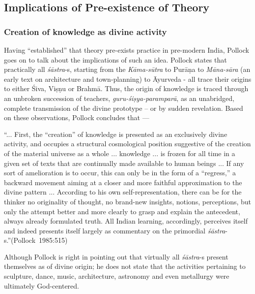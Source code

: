 \subsection{Implications of Pre-existence of Theory}\label{art12-sec3.8}

\subsubsection{Creation of knowledge as divine activity}\label{art12-sec3.8.1}

Having ``established'' that theory pre-exists practice in pre-modern India, Pollock goes on to talk about the implications of such an idea. Pollock states that practically all {\sl śāstra}-s, starting from the {\sl Kāma-sūtra} to Purāṇa to {\sl Māna-sāra} (an early text on architecture and town-planning) to Āyurveda - all trace their origins  to either Śiva, Viṣṇu or Brahmā. Thus, the origin of knowledge is traced through an unbroken succession of teachers, {\sl guru-śiṣya-paramparā}, as an unabridged, complete transmission of the divine prototype -- or by sudden revelation. Based on these observations, Pollock concludes that ---

\begin{myquote}
``... First, the ``creation'' of knowledge is presented as an exclusively divine activity, and occupies a structural cosmological position suggestive of the creation of the material universe as a whole ... knowledge ... is frozen for all time in a given set of texts that are continually made available to human beings ... If any sort of amelioration is to occur, this  can only be in the form of a ``regress,'' a backward movement aiming at a closer and more  faithful approximation to the divine pattern ...  According to his own self-representation, there can be for the thinker no originality of thought, no brand-new insights, notions, perceptions, but only the attempt better and more clearly to grasp and explain the antecedent, always already formulated truth. All Indian learning, accordingly, perceives itself and indeed presents itself largely as commentary on the primordial {\sl śāstra}-s.''\hfill \hbox{(Pollock 1985:515)}
\end{myquote}

Although Pollock is right in pointing out that virtually all \hbox{{\sl śāstra}-s} present themselves as of divine origin; he does not state that the activities pertaining to sculpture, dance, music, architecture, astronomy and even metallurgy were ultimately God-centered. 

